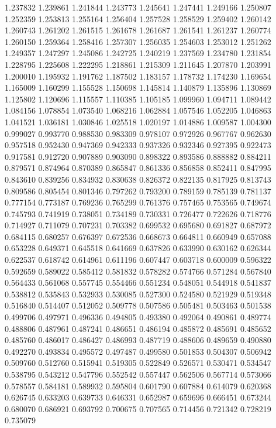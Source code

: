 1.237832
1.239861
1.241844
1.243773
1.245641
1.247441
1.249166
1.250807
1.252359
1.253813
1.255164
1.256404
1.257528
1.258529
1.259402
1.260142
1.260743
1.261202
1.261515
1.261678
1.261687
1.261541
1.261237
1.260774
1.260150
1.259364
1.258416
1.257307
1.256035
1.254603
1.253012
1.251262
1.249357
1.247297
1.245086
1.242725
1.240219
1.237569
1.234780
1.231854
1.228795
1.225608
1.222295
1.218861
1.215309
1.211645
1.207870
1.203991
1.200010
1.195932
1.191762
1.187502
1.183157
1.178732
1.174230
1.169654
1.165009
1.160299
1.155528
1.150698
1.145814
1.140879
1.135896
1.130869
1.125802
1.120696
1.115557
1.110385
1.105185
1.099960
1.094711
1.089442
1.084156
1.078854
1.073540
1.068216
1.062884
1.057546
1.052205
1.046863
1.041521
1.036181
1.030846
1.025518
1.020197
1.014886
1.009587
1.004300
0.999027
0.993770
0.988530
0.983309
0.978107
0.972926
0.967767
0.962630
0.957518
0.952430
0.947369
0.942333
0.937326
0.932346
0.927395
0.922473
0.917581
0.912720
0.907889
0.903090
0.898322
0.893586
0.888882
0.884211
0.879571
0.874964
0.870389
0.865847
0.861336
0.856858
0.852411
0.847995
0.843610
0.839256
0.834932
0.830638
0.826372
0.822135
0.817925
0.813743
0.809586
0.805454
0.801346
0.797262
0.793200
0.789159
0.785139
0.781137
0.777154
0.773187
0.769236
0.765299
0.761376
0.757465
0.753565
0.749674
0.745793
0.741919
0.738051
0.734189
0.730331
0.726477
0.722626
0.718776
0.714927
0.711079
0.707231
0.703382
0.699532
0.695680
0.691827
0.687972
0.684115
0.680257
0.676397
0.672536
0.668673
0.664811
0.660949
0.657088
0.653228
0.649371
0.645518
0.641669
0.637826
0.633990
0.630162
0.626344
0.622537
0.618742
0.614961
0.611196
0.607447
0.603718
0.600009
0.596322
0.592659
0.589022
0.585412
0.581832
0.578282
0.574766
0.571284
0.567840
0.564433
0.561068
0.557745
0.554466
0.551234
0.548051
0.544918
0.541837
0.538812
0.535843
0.532933
0.530085
0.527300
0.524580
0.521929
0.519348
0.516840
0.514407
0.512052
0.509778
0.507586
0.505481
0.503463
0.501538
0.499706
0.497971
0.496336
0.494805
0.493380
0.492064
0.490861
0.489774
0.488806
0.487961
0.487241
0.486651
0.486194
0.485872
0.485691
0.485652
0.485760
0.486017
0.486427
0.486993
0.487719
0.488606
0.489659
0.490880
0.492270
0.493834
0.495572
0.497487
0.499580
0.501853
0.504307
0.506942
0.509760
0.512760
0.515941
0.519305
0.522849
0.526571
0.530471
0.534547
0.538795
0.543212
0.547796
0.552542
0.557447
0.562506
0.567714
0.573066
0.578557
0.584181
0.589932
0.595804
0.601790
0.607884
0.614079
0.620368
0.626745
0.633203
0.639733
0.646331
0.652987
0.659696
0.666451
0.673244
0.680070
0.686921
0.693792
0.700675
0.707565
0.714456
0.721342
0.728219
0.735079
